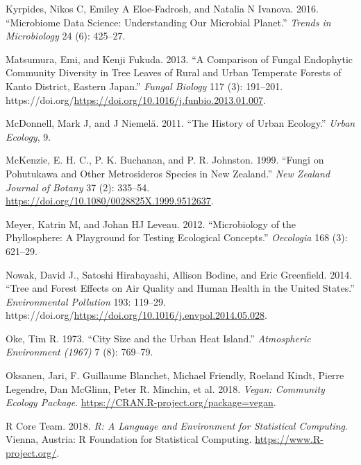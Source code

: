\documentclass[fleqn,10pt,lineno]{wlpeerj} %
\newlength{\cslhangindent}
\newenvironment{CSLReferences}[2] %
 {%
  \setlength{\parindent}{0pt}
  \ifodd #1 \everypar{\setlength{\hangindent}{\cslhangindent}}\ignorespaces\fi
  \ifnum #2 > 0
  \setlength{\parskip}{#2\baselineskip}
  \fi
 }%
 {}
\begin{document}
\begin{CSLReferences}{1}{0}
\leavevmode{}%
Kyrpides, Nikos C, Emiley A Eloe-Fadrosh, and Natalia N Ivanova. 2016.
{``Microbiome Data Science: Understanding Our Microbial Planet.''}
\emph{Trends in Microbiology} 24 (6): 425--27.

\leavevmode{}%
Matsumura, Emi, and Kenji Fukuda. 2013. {``A Comparison of Fungal
Endophytic Community Diversity in Tree Leaves of Rural and Urban
Temperate Forests of Kanto District, Eastern Japan.''} \emph{Fungal
Biology} 117 (3): 191--201.
https://doi.org/\url{https://doi.org/10.1016/j.funbio.2013.01.007}.

\leavevmode{}%
McDonnell, Mark J, and J Niemelä. 2011. {``The History of Urban
Ecology.''} \emph{Urban Ecology}, 9.

\leavevmode{}%
McKenzie, E. H. C., P. K. Buchanan, and P. R. Johnston. 1999. {``Fungi
on Pohutukawa and Other Metrosideros Species in New Zealand.''}
\emph{New Zealand Journal of Botany} 37 (2): 335--54.
\url{https://doi.org/10.1080/0028825X.1999.9512637}.

\leavevmode{}%
Meyer, Katrin M, and Johan HJ Leveau. 2012. {``Microbiology of the
Phyllosphere: A Playground for Testing Ecological Concepts.''}
\emph{Oecologia} 168 (3): 621--29.

\leavevmode{}%
Nowak, David J., Satoshi Hirabayashi, Allison Bodine, and Eric
Greenfield. 2014. {``Tree and Forest Effects on Air Quality and Human
Health in the United States.''} \emph{Environmental Pollution} 193:
119--29.
https://doi.org/\url{https://doi.org/10.1016/j.envpol.2014.05.028}.

\leavevmode{}%
Oke, Tim R. 1973. {``City Size and the Urban Heat Island.''}
\emph{Atmospheric Environment (1967)} 7 (8): 769--79.

\leavevmode{}%
Oksanen, Jari, F. Guillaume Blanchet, Michael Friendly, Roeland Kindt,
Pierre Legendre, Dan McGlinn, Peter R. Minchin, et al. 2018.
\emph{Vegan: Community Ecology Package}.
\url{https://CRAN.R-project.org/package=vegan}.

\leavevmode{}%
R Core Team. 2018. \emph{R: A Language and Environment for Statistical
Computing}. Vienna, Austria: R Foundation for Statistical Computing.
\url{https://www.R-project.org/}.


\end{CSLReferences}
\end{document}

